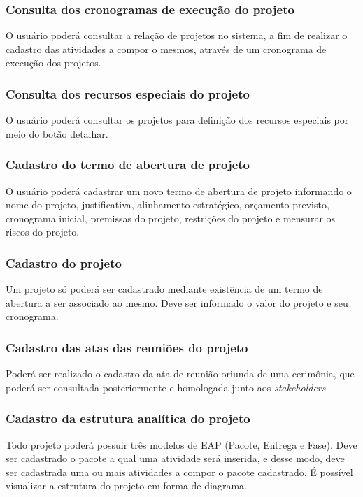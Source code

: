 \documentclass{acm_proc_article-sp}
\begin{document}
\subsubsection{Consulta dos cronogramas de execução do projeto}
O usuário poderá consultar a relação de projetos no sistema, a fim de realizar o cadastro das atividades a compor o mesmos, através de um cronograma de execução dos projetos.

\subsubsection{Consulta dos recursos especiais do projeto}
O usuário poderá consultar os projetos para definição dos recursos especiais por meio do botão detalhar.

\subsubsection{Cadastro do termo de abertura de projeto}
O usuário poderá cadastrar um novo termo de abertura de projeto informando o nome do projeto, justificativa, alinhamento estratégico, orçamento previsto, cronograma inicial, premissas do projeto, restrições do projeto e mensurar os riscos do projeto. 

\subsubsection{Cadastro do projeto}
Um projeto só poderá ser cadastrado mediante existência de um termo de abertura a ser associado ao mesmo. Deve ser informado o valor do projeto e seu cronograma.

\subsubsection{Cadastro das atas das reuniões do projeto}
Poderá ser realizado o cadastro da ata de reunião oriunda de uma cerimônia, que poderá ser consultada posteriormente e homologada junto aos \textit{stakeholders}.

\subsubsection{Cadastro da estrutura analítica do projeto}
Todo projeto poderá possuir três modelos de EAP (Pacote, Entrega e Fase). Deve ser cadastrado o pacote a qual uma atividade será inserida, e desse modo, deve ser cadastrada uma ou mais atividades a compor o pacote cadastrado. É possível visualizar a estrutura do projeto em forma de diagrama. 
\end{document}
